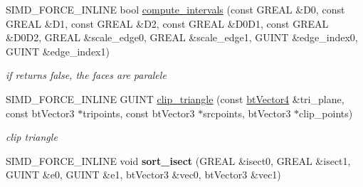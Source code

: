 \begin{DoxyCompactItemize}
\item 
\hypertarget{class_g_i_m___t_r_i_a_n_g_l_e___c_a_l_c_u_l_a_t_i_o_n___c_a_c_h_e_ac7148501d7abedb29153fe729cab4558}{S\+I\+M\+D\+\_\+\+F\+O\+R\+C\+E\+\_\+\+I\+N\+L\+I\+N\+E bool \hyperlink{class_g_i_m___t_r_i_a_n_g_l_e___c_a_l_c_u_l_a_t_i_o_n___c_a_c_h_e_ac7148501d7abedb29153fe729cab4558}{compute\+\_\+intervals} (const G\+R\+E\+A\+L \&D0, const G\+R\+E\+A\+L \&D1, const G\+R\+E\+A\+L \&D2, const G\+R\+E\+A\+L \&D0\+D1, const G\+R\+E\+A\+L \&D0\+D2, G\+R\+E\+A\+L \&scale\+\_\+edge0, G\+R\+E\+A\+L \&scale\+\_\+edge1, G\+U\+I\+N\+T \&edge\+\_\+index0, G\+U\+I\+N\+T \&edge\+\_\+index1)}\label{class_g_i_m___t_r_i_a_n_g_l_e___c_a_l_c_u_l_a_t_i_o_n___c_a_c_h_e_ac7148501d7abedb29153fe729cab4558}

\begin{DoxyCompactList}\small\item\em if returns false, the faces are paralele \end{DoxyCompactList}\item 
\hypertarget{class_g_i_m___t_r_i_a_n_g_l_e___c_a_l_c_u_l_a_t_i_o_n___c_a_c_h_e_ac07d15d399c84583e1c5411a379f85bb}{S\+I\+M\+D\+\_\+\+F\+O\+R\+C\+E\+\_\+\+I\+N\+L\+I\+N\+E G\+U\+I\+N\+T \hyperlink{class_g_i_m___t_r_i_a_n_g_l_e___c_a_l_c_u_l_a_t_i_o_n___c_a_c_h_e_ac07d15d399c84583e1c5411a379f85bb}{clip\+\_\+triangle} (const \hyperlink{classbt_vector4}{bt\+Vector4} \&tri\+\_\+plane, const bt\+Vector3 $\ast$tripoints, const bt\+Vector3 $\ast$srcpoints, bt\+Vector3 $\ast$clip\+\_\+points)}\label{class_g_i_m___t_r_i_a_n_g_l_e___c_a_l_c_u_l_a_t_i_o_n___c_a_c_h_e_ac07d15d399c84583e1c5411a379f85bb}

\begin{DoxyCompactList}\small\item\em clip triangle \end{DoxyCompactList}\item 
\hypertarget{class_g_i_m___t_r_i_a_n_g_l_e___c_a_l_c_u_l_a_t_i_o_n___c_a_c_h_e_ad1369ac1b47538278c1e3f55db600bc3}{S\+I\+M\+D\+\_\+\+F\+O\+R\+C\+E\+\_\+\+I\+N\+L\+I\+N\+E void {\bfseries sort\+\_\+isect} (G\+R\+E\+A\+L \&isect0, G\+R\+E\+A\+L \&isect1, G\+U\+I\+N\+T \&e0, G\+U\+I\+N\+T \&e1, bt\+Vector3 \&vec0, bt\+Vector3 \&vec1)}\label{class_g_i_m___t_r_i_a_n_g_l_e___c_a_l_c_u_l_a_t_i_o_n___c_a_c_h_e_ad1369ac1b47538278c1e3f55db600bc3}


\end{DoxyCompactItemize}
